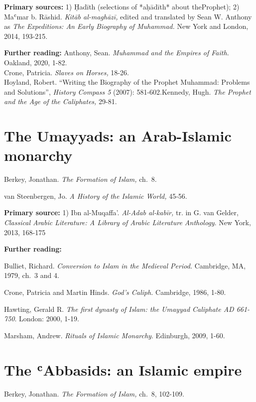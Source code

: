 \documentclass[
]{book}
\begin{document}
\textbf{Primary sources:} 1) Ḥadīth (selections of *aḥādīth* about theProphet); 2) Maʿmar b. Rāshid. \emph{Kitāb al-maghāzī,} edited and translated by Sean W. Anthony as \emph{The Expeditions: An Early Biography of Muhammad.} New York and London, 2014, 193-215.

\textbf{Further reading:}
Anthony, Sean. \emph{Muhammad and the Empires of Faith.} Oakland, 2020, 1-82.\\
Crone, Patricia. \emph{Slaves on Horses,} 18-26.\\
Hoyland, Robert. ``Writing the Biography of the Prophet Muhammad: Problems and Solutions'', \emph{History Compass 5} (2007): 581-602.Kennedy, Hugh. \emph{The Prophet and the Age of the Caliphates,} 29-81.

\hypertarget{the-umayyads-an-arab-islamic-monarchy}{%
\chapter{The Umayyads: an Arab-Islamic monarchy}\label{the-umayyads-an-arab-islamic-monarchy}}

Berkey, Jonathan. \emph{The Formation of Islam,} ch.~8.

van Steenbergen, Jo. \emph{A History of the Islamic World,} 45-56.

\textbf{Primary source:} 1) Ibn al-Muqaffa'. \emph{Al-Adab al-kabīr,} tr. in G.
van Gelder, \emph{Classical Arabic Literature: A Library of Arabic Literature
Anthology}. New York, 2013, 168-175

\textbf{Further reading:}

Bulliet, Richard. \emph{Conversion to Islam in the Medieval Period.}
Cambridge, MA, 1979, ch.~3 and 4.

Crone, Patricia and Martin Hinds. \emph{God's Caliph.} Cambridge, 1986, 1-80.

Hawting, Gerald R. \emph{The first dynasty of Islam: the Umayyad Caliphate AD 661-750}. London: 2000, 1-19.

Marsham, Andrew. \emph{Rituals of Islamic Monarchy}. Edinburgh, 2009, 1-60.

\hypertarget{the-ux2bfabbasids-an-islamic-empire}{%
\chapter{The ʿAbbasids: an Islamic empire}\label{the-ux2bfabbasids-an-islamic-empire}}

Berkey, Jonathan. \emph{The Formation of Islam,} ch.~8, 102-109.
\end{document}
